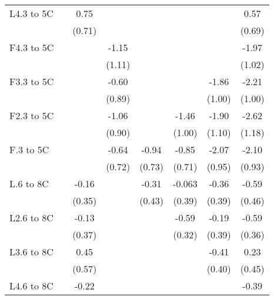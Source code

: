 \documentclass[paper=letterpaper, fontsize=11pt]{article} %
\begin{document}
{\begin{landscape}
\begin{longtable}{l*{7}{c}}
L4.3 to 5C          &            &        0.75&            &            &            &            &        0.57\\
                    &            &      (0.71)&            &            &            &            &      (0.69)\\
F4.3 to 5C          &            &            &       -1.15&            &            &            &       -1.97\\
                    &            &            &      (1.11)&            &            &            &      (1.02)\\
F3.3 to 5C          &            &            &       -0.60&            &            &       -1.86&       -2.21\\
                    &            &            &      (0.89)&            &            &      (1.00)&      (1.00)\\
F2.3 to 5C          &            &            &       -1.06&            &       -1.46&       -1.90&       -2.62\\
                    &            &            &      (0.90)&            &      (1.00)&      (1.10)&      (1.18)\\
F.3 to 5C           &            &            &       -0.64&       -0.94&       -0.85&       -2.07&       -2.10\\
                    &            &            &      (0.72)&      (0.73)&      (0.71)&      (0.95)&      (0.93)\\
L.6 to 8C           &            &       -0.16&            &       -0.31&      -0.063&       -0.36&       -0.59\\
                    &            &      (0.35)&            &      (0.43)&      (0.39)&      (0.39)&      (0.46)\\
L2.6 to 8C          &            &       -0.13&            &            &       -0.59&       -0.19&       -0.59\\
                    &            &      (0.37)&            &            &      (0.32)&      (0.39)&      (0.36)\\
L3.6 to 8C          &            &        0.45&            &            &            &       -0.41&        0.23\\
                    &            &      (0.57)&            &            &            &      (0.40)&      (0.45)\\
L4.6 to 8C          &            &       -0.22&            &            &            &            &       -0.39\\

\end{longtable}
\end{landscape}}
\end{document}
